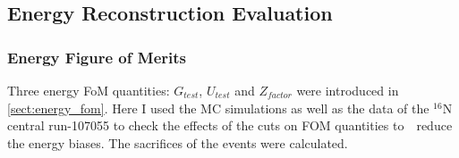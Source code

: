 

\subsection{Energy Reconstruction Evaluation}
\subsubsection{Energy Figure of Merits}\label{sect:energy_fomTest}
Three energy FoM quantities: $G_{test}$, $U_{test}$ and $Z_{factor}$ were introduced in \ref{sect:energy_fom}.
Here I used the MC simulations as well as the data of the $^{16}$N central run-107055 to check the effects of the cuts on FOM quantities to　reduce the energy biases. The sacrifices of the events were calculated. 


